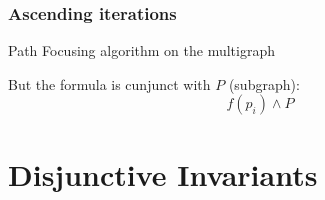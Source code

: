 \documentclass{beamer}
\begin{document}
\begin{frame}
	\frametitle{Ascending iterations}

	Path Focusing algorithm on the multigraph

	\vspace{1cm}	

	But the formula is cunjunct with $P$ (subgraph): 
	$$f(p_i) \wedge P$$

	\vspace{1cm}
\end{frame}

%
%

\section{Disjunctive Invariants}
\end{document}
